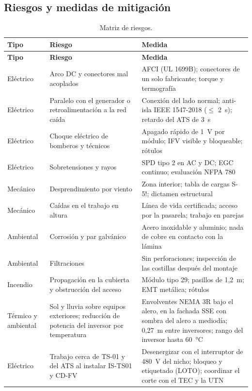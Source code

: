 \documentclass[12pt]{article}
\begin{document}
\subsection{Riesgos y medidas de mitigación}
\label{sec:riesgos}
{\small
\begin{longtable}{L{2.2cm}L{5.4cm}L{7.2cm}}
\caption{Matriz de riesgos.}\label{tab:riesgos}\\
\toprule
\textbf{Tipo} & \textbf{Riesgo} & \textbf{Medida}\\
\midrule\endfirsthead
\toprule
\textbf{Tipo} & \textbf{Riesgo} & \textbf{Medida}\\
\midrule\endhead
Eléctrico & Arco DC y conectores mal acoplados & AFCI (UL 1699B); conectores de un solo fabricante; torque y termografía\\
Eléctrico & Paralelo con el generador o retroalimentación a la red caída & Conexión del lado normal; anti-isla IEEE 1547-2018 ($\leq$ 2~s); retardo del ATS de 3~s\\
Eléctrico & Choque eléctrico de bomberos y técnicos & Apagado rápido de 1~V por módulo; IFV visible y bloqueable; rótulos\\
Eléctrico & Sobretensiones y rayos & SPD tipo 2 en AC y DC; EGC continuo; evaluación NFPA 780\\
Mecánico & Desprendimiento por viento & Zona interior; tabla de cargas S-5!; dictamen estructural\\
Mecánico & Caídas en el trabajo en altura & Línea de vida certificada; acceso por la pasarela; trabajo en parejas\\
Ambiental & Corrosión y par galvánico & Acero inoxidable y aluminio; nada de cobre en contacto con la lámina\\
Ambiental & Filtraciones & Sin perforaciones; inspección de las costillas después del montaje\\
Incendio & Propagación en la cubierta y obstrucción del acceso & Módulo tipo 29; pasillos de 1,2~m; EMT metálica; rótulos\\
Térmico y ambiental & Sol y lluvia sobre equipos exteriores; reducción de potencia del inversor por temperatura & Envolventes NEMA 3R bajo el alero, en la fachada SSE con sombra del alero a mediodía; 0,27~m entre inversores; rango del inversor hasta 60~°C\\
Eléctrico & Trabajo cerca de TS-01 y del ATS al instalar IS-TS01 y CD-FV & Desenergizar con el interruptor de 480~V del nicho; bloqueo y etiquetado (LOTO); coordinar el corte con el TEC y la UTN\\
\bottomrule
\end{longtable}}
\end{document}
